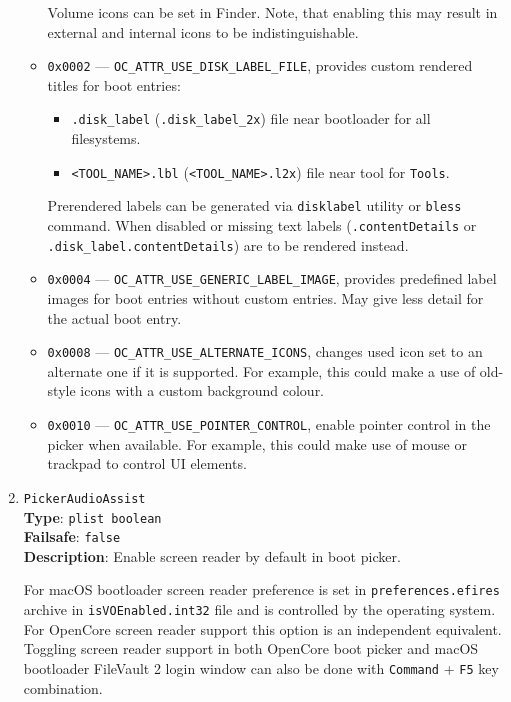 \documentclass[]{article}
\providecommand{\tightlist}{%
  \setlength{\itemsep}{0pt}\setlength{\parskip}{0pt}}
\begin{document}
\begin{enumerate}
\begin{itemize}
    Volume icons can be set in Finder. Note, that enabling this may result in
    external and internal icons to be indistinguishable.
  \item \texttt{0x0002} --- \texttt{OC\_ATTR\_USE\_DISK\_LABEL\_FILE}, provides custom
    rendered titles for boot entries:
    \begin{itemize}
    \tightlist
      \item \texttt{.disk\_label} (\texttt{.disk\_label\_2x}) file near bootloader for all filesystems.
      \item \texttt{<TOOL\_NAME>.lbl} (\texttt{<TOOL\_NAME>.l2x}) file near tool for \texttt{Tools}.
    \end{itemize}
    Prerendered labels can be generated via \texttt{disklabel} utility or \texttt{bless} command.
    When disabled or missing text labels (\texttt{.contentDetails} or \texttt{.disk\_label.contentDetails})
    are to be rendered instead.
  \item \texttt{0x0004} --- \texttt{OC\_ATTR\_USE\_GENERIC\_LABEL\_IMAGE}, provides predefined
    label images for boot entries without custom entries. May give less detail for the actual
    boot entry.
  \item \texttt{0x0008} --- \texttt{OC\_ATTR\_USE\_ALTERNATE\_ICONS}, changes used icon set to
    an alternate one if it is supported. For example, this could make a use of old-style icons
    with a custom background colour.
  \item \texttt{0x0010} --- \texttt{OC\_ATTR\_USE\_POINTER\_CONTROL}, enable pointer control
  in the picker when available. For example, this could make use of mouse or trackpad to
  control UI elements.
  \end{itemize}

\item
  \texttt{PickerAudioAssist}\\
  \textbf{Type}: \texttt{plist\ boolean}\\
  \textbf{Failsafe}: \texttt{false}\\
  \textbf{Description}: Enable screen reader by default in boot picker.

  For macOS bootloader screen reader preference is set in \texttt{preferences.efires}
  archive in \texttt{isVOEnabled.int32} file and is controlled by the operating system.
  For OpenCore screen reader support this option is an independent equivalent.
  Toggling screen reader support in both OpenCore boot picker and macOS bootloader
  FileVault 2 login window can also be done with \texttt{Command} + \texttt{F5} key
  combination.


\end{enumerate}
\end{document}
